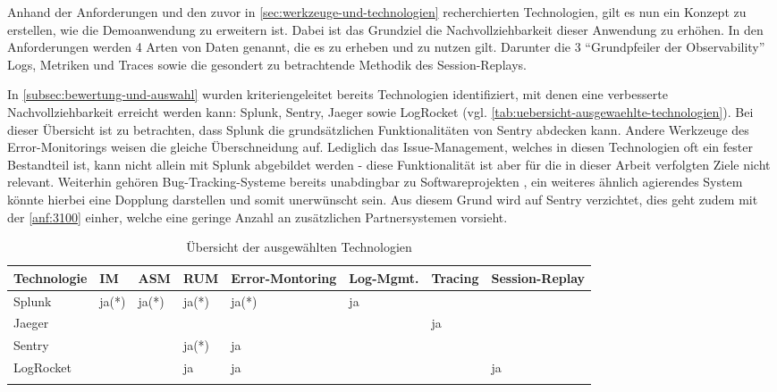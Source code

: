 % 

Anhand der Anforderungen und den zuvor in \autoref{sec:werkzeuge-und-technologien} recherchierten Technologien, gilt es nun ein Konzept zu erstellen, wie die Demoanwendung zu erweitern ist. Dabei ist das Grundziel die Nachvollziehbarkeit dieser Anwendung zu erhöhen. In den Anforderungen werden 4 Arten von Daten genannt, die es zu erheben und zu nutzen gilt. Darunter die 3 \enquote{Grundpfeiler der Observability} Logs, Metriken und Traces sowie die gesondert zu betrachtende Methodik des Session-Replays.

In \autoref{subsec:bewertung-und-auswahl} wurden kriteriengeleitet bereits Technologien identifiziert, mit denen eine verbesserte Nachvollziehbarkeit erreicht werden kann: Splunk, Sentry, Jaeger sowie LogRocket (vgl. \autoref{tab:uebersicht-ausgewaehlte-technologien}). Bei dieser Übersicht ist zu betrachten, dass Splunk die grundsätzlichen Funktionalitäten von Sentry abdecken kann. Andere Werkzeuge des Error-Monitorings weisen die gleiche Überschneidung auf. Lediglich das Issue-Management, welches in diesen Technologien oft ein fester Bestandteil ist, kann nicht allein mit Splunk abgebildet werden - diese Funktionalität ist aber für die in dieser Arbeit verfolgten Ziele nicht relevant. Weiterhin gehören Bug-Tracking-Systeme bereits unabdingbar zu Softwareprojekten \cite{BugzillaITrackerAndOtherBugTrackers}, ein weiteres ähnlich agierendes System könnte hierbei eine Dopplung darstellen und somit unerwünscht sein. Aus diesem Grund wird auf Sentry verzichtet, dies geht zudem mit der \autoref{anf:3100} einher, welche eine geringe Anzahl an zusätzlichen Partnersystemen vorsieht.

\begingroup
\centering
\setlength{\LTleft}{-20cm plus -1fill}
\setlength{\LTright}{\LTleft}
\begin{longtable}{|p{4.10cm}|p{0.90cm}|p{0.90cm}|p{1.9cm}|p{1.75cm}|p{1.5cm}|p{1.4cm}|p{1.3cm}|}
\hline
Technologie & IM & ASM & RUM & Error-Montoring & Log-Mgmt. & Tracing & Session-Replay \\
\endhead
\hline
Splunk & ja(*) & ja(*) & ja(*) & ja(*) & ja &  &  \\
\hline
Jaeger &  &  &  &  &  & ja &  \\
\hline
Sentry &  &  & ja(*) & ja &  &  &  \\
\hline
LogRocket &  &  & ja & ja &  &  & ja \\
\hline
\caption{Übersicht der ausgewählten Technologien}
\label{tab:uebersicht-ausgewaehlte-technologien}
\end{longtable}
\endgroup


